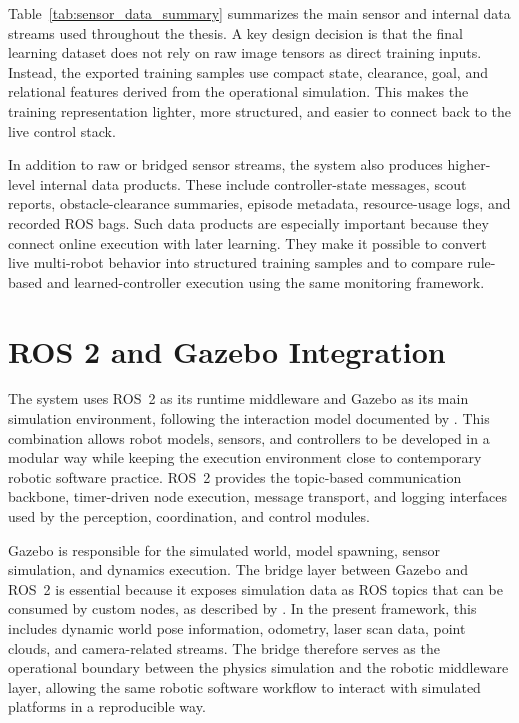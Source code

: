 Table~\ref{tab:sensor_data_summary} summarizes the main sensor and internal data streams used throughout the thesis. A key design decision is that the final learning dataset does not rely on raw image tensors as direct training inputs. Instead, the exported training samples use compact state, clearance, goal, and relational features derived from the operational simulation. This makes the training representation lighter, more structured, and easier to connect back to the live control stack.

In addition to raw or bridged sensor streams, the system also produces higher-level internal data products. These include controller-state messages, scout reports, obstacle-clearance summaries, episode metadata, resource-usage logs, and recorded ROS bags. Such data products are especially important because they connect online execution with later learning. They make it possible to convert live multi-robot behavior into structured training samples and to compare rule-based and learned-controller execution using the same monitoring framework.

\section{ROS 2 and Gazebo Integration}

The system uses ROS~2 as its runtime middleware and Gazebo as its main simulation environment, following the interaction model documented by \citeauthor{gazeboros2docs} \citep{gazeboros2docs}. This combination allows robot models, sensors, and controllers to be developed in a modular way while keeping the execution environment close to contemporary robotic software practice. ROS~2 provides the topic-based communication backbone, timer-driven node execution, message transport, and logging interfaces used by the perception, coordination, and control modules.

Gazebo is responsible for the simulated world, model spawning, sensor simulation, and dynamics execution. The bridge layer between Gazebo and ROS~2 is essential because it exposes simulation data as ROS topics that can be consumed by custom nodes, as described by \citeauthor{rosgzbridgedocs} \citep{rosgzbridgedocs}. In the present framework, this includes dynamic world pose information, odometry, laser scan data, point clouds, and camera-related streams. The bridge therefore serves as the operational boundary between the physics simulation and the robotic middleware layer, allowing the same robotic software workflow to interact with simulated platforms in a reproducible way.

